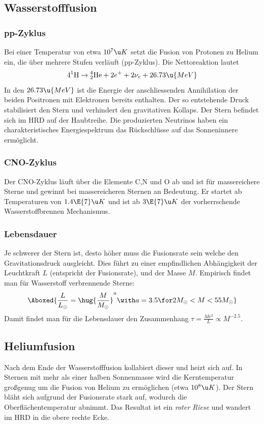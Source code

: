 \documentclass[final]{summery_5.0}
\begin{document}
\subsection{Wasserstofffusion} 
\subsubsection{pp-Zyklus}
Bei einer Temperatur von etwa $10^7\u K$ setzt die Fusion von Protonen zu
Helium ein, die über mehrere Stufen verläuft (pp-Zyklus).
Die Nettoreaktion lautet
\begin{align*}
    4 ^1 \mathrm H \to {}^4_2\mathrm{He} + 2 e^+ + 2 \nu_e + 26.73\u{MeV}
\end{align*}
In den $26.73 \u{MeV}$ ist die Energie der anschliessenden Annihilation der
beiden Positronen mit Elektronen bereits enthalten. Der so entstehende Druck stabilisiert den Stern und verhindert den gravitativen Kollaps. Der Stern befindet sich im HRD auf der Haubtreihe.
Die produzierten Neutrinos haben ein charakteristisches Energiespektrum das Rückschlüsse auf das Sonneninnere ermöglicht.

\subsubsection{CNO-Zyklus}
Der CNO-Zyklus läuft über die Elemente C,N und O ab und ist für massereichere Sterne und gewinnt bei massereicheren Sternen an Bedeutung. Er startet ab Temperaturen von $1.4\E{7}\u K $ und ist ab $3\E{7}\u K$ der vorherrschende Wasserstoffbrennen Mechanismus. 

\subsubsection{Lebensdauer}
Je schwerer der Stern ist, desto höher muss die Fusionsrate sein welche den Gravitationsdruck ausgleicht. Dies führt zu einer empfindlichen Abhängigkeit der Leuchtkraft $L$ (entspricht der Fusionsrate), und der Masse $M$. Empirisch findet man für Wasserstoff verbrennende Sterne:
\begin{align*}
    \Aboxed{\frac{L}{L_\odot} = \hug{\frac M{M_\odot}}^a \with a=3.5 \for 2M_\odot<M<55M_\odot}
\end{align*}
Damit findet man für die Lebensdauer den Zusammenhang $\tau =\frac{M c^2}{L} \propto M^{-2.5}$.

\subsection{Heliumfusion}
Nach dem Ende der Wasserstofffusion kollabiert dieser und heizt sich auf. In Sternen mit mehr als einer halben Sonnenmasse wird die Kerntemperatur großgenug um die Fusion von Helium zu ermöglichen (etwa $10^{8}\u K$). Der Stern bläht sich aufgrund der Fusionsrate stark auf, wodurch die Oberflächentemperatur abnimmt. Das Resultat ist ein \emph{roter Riese} und wandert im HRD in die obere rechte Ecke.
\end{document}

